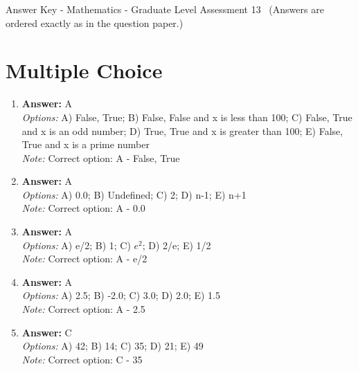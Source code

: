 \documentclass[12pt]{article}
\begin{document}
\begin{center}
Answer Key - Mathematics - Graduate Level Assessment 13 \
\small (Answers are ordered exactly as in the question paper.)
\end{center}

\section*{Multiple Choice}
\begin{enumerate}[label=\arabic*.]
\item \textbf{Answer:} A
\\ \textit{Options:} A) False, True; B) False, False and x is less than 100; C) False, True and x is an odd number; D) True, True and x is greater than 100; E) False, True and x is a prime number
\\ \textit{Note:} Correct option: A - False, True
\item \textbf{Answer:} A
\\ \textit{Options:} A) 0.0; B) Undefined; C) 2; D) n-1; E) n+1
\\ \textit{Note:} Correct option: A - 0.0
\item \textbf{Answer:} A
\\ \textit{Options:} A) e/2; B) 1; C) $e^2$; D) 2/e; E) 1/2
\\ \textit{Note:} Correct option: A - e/2
\item \textbf{Answer:} A
\\ \textit{Options:} A) 2.5; B) -2.0; C) 3.0; D) 2.0; E) 1.5
\\ \textit{Note:} Correct option: A - 2.5
\item \textbf{Answer:} C
\\ \textit{Options:} A) 42; B) 14; C) 35; D) 21; E) 49
\\ \textit{Note:} Correct option: C - 35
\end{enumerate}
\end{document}
